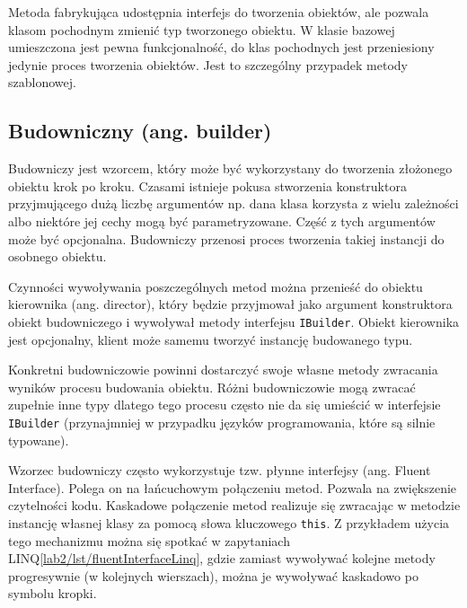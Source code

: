 Metoda fabrykująca udostępnia interfejs do tworzenia obiektów, ale pozwala klasom pochodnym zmienić typ tworzonego obiektu. W klasie bazowej umieszczona jest pewna funkcjonalność, do klas pochodnych jest przeniesiony jedynie proces tworzenia obiektów. Jest to szczególny przypadek metody szablonowej.
%	
%
%

\subsection{Budowniczny (ang. builder)}
Budowniczy jest wzorcem, który może być wykorzystany do tworzenia złożonego obiektu krok po kroku. Czasami istnieje pokusa stworzenia konstruktora przyjmującego dużą liczbę argumentów np. dana klasa korzysta z wielu zależności albo niektóre jej cechy mogą być parametryzowane. Część z tych argumentów może być opcjonalna. Budowniczy przenosi proces tworzenia takiej instancji do osobnego obiektu. 

Czynności wywoływania poszczególnych metod można przenieść do obiektu kierownika (ang. director), który będzie przyjmował jako argument konstruktora obiekt budowniczego i wywoływał metody interfejsu \texttt{IBuilder}. Obiekt kierownika jest opcjonalny, klient może samemu tworzyć instancję budowanego typu. 

Konkretni budowniczowie powinni dostarczyć swoje własne metody zwracania wyników procesu budowania obiektu. Różni budowniczowie mogą zwracać zupełnie inne typy dlatego tego procesu często nie da się umieścić w interfejsie \texttt{IBuilder} (przynajmniej w przypadku języków programowania, które są silnie typowane). 
 
Wzorzec budowniczy często wykorzystuje tzw. płynne interfejsy (ang. Fluent Interface). Polega on na łańcuchowym połączeniu metod. Pozwala na zwiększenie czytelności kodu. Kaskadowe połączenie metod realizuje się zwracając w metodzie instancję własnej klasy za pomocą słowa kluczowego \texttt{this}. Z przykładem użycia tego mechanizmu można się spotkać w zapytaniach LINQ\ref{lab2/lst/fluentInterfaceLinq}, gdzie zamiast wywoływać kolejne metody progresywnie (w kolejnych wierszach), można je wywoływać kaskadowo po symbolu kropki. 

